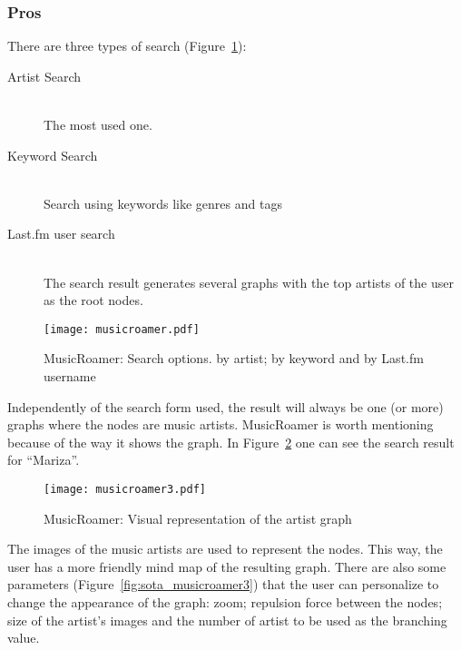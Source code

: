    \subsubsection{Pros} %
    \label{ssub:pros}

      There are three types of search (Figure~\ref{fig:sota_musicroamer}): 

      \begin{description}
        \item[Artist Search] \hfill \\
          The most used one.
        \item[Keyword Search] \hfill \\
          Search using keywords like genres and tags
        \item[Last.fm user search] \hfill \\
          The search result generates several graphs with the top artists of the user as the root nodes.
      \end{description}

      \begin{figure}[hb]
        \begin{center}
          \texttt{[image: musicroamer.pdf]}
        \end{center}
        \caption{MusicRoamer: Search options. by artist; by keyword and by Last.fm username}
        \label{fig:sota_musicroamer}
      \end{figure}

      Independently of the search form used, the result will always be one (or more) graphs where the nodes are music artists.
      MusicRoamer is worth mentioning because of the way it shows the graph.
      In Figure~\ref{fig:sota_musicroamer2} one can see the search result for ``Mariza''.

      \begin{figure}[H]
        \begin{center}
          \texttt{[image: musicroamer3.pdf]}
        \end{center}
        \caption{MusicRoamer: Visual representation of the artist graph}
        \label{fig:sota_musicroamer2}
      \end{figure}

      The images of the music artists are used to represent the nodes.
      This way, the user has a more friendly mind map of the resulting graph.
      There are also some parameters (Figure~\ref{fig:sota_musicroamer3}) that the user can personalize to change the appearance of the graph: zoom; repulsion force between the nodes; size of the artist's images and the number of artist to be used as the branching value.

